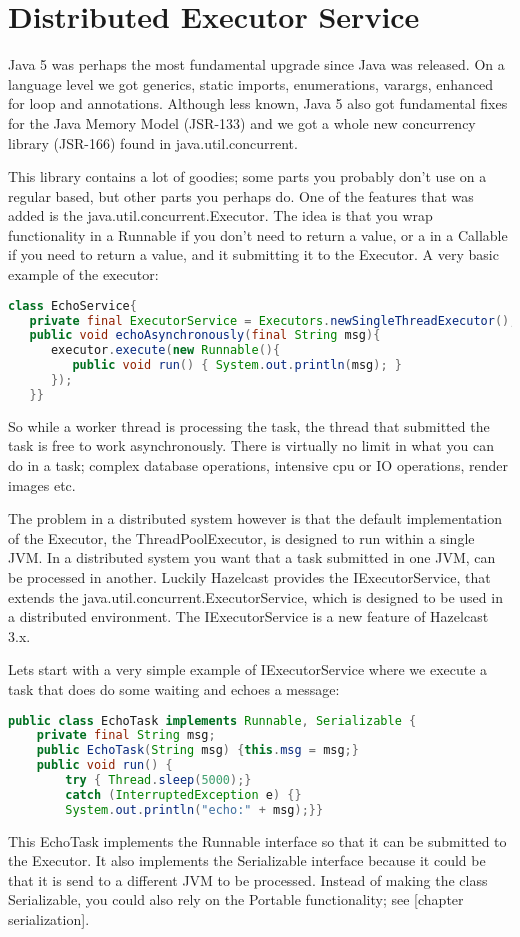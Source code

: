 \chapter{Distributed Executor Service}
Java 5 was perhaps the most fundamental upgrade since Java was released. On a language level we got generics, static imports, enumerations, varargs, enhanced for loop and annotations. Although less known, Java 5 also got fundamental fixes for the Java Memory Model (JSR-133) and we got a whole new concurrency library (JSR-166) found in java.util.concurrent.

This library contains a lot of goodies; some parts you probably don't use on a regular based, but other parts you perhaps do. One of the features that was added is the java.util.concurrent.Executor. The idea is that you wrap functionality in a Runnable if you don't need to return a value, or a in a Callable if you need to return a value, and it submitting it to the Executor. A very basic example of the executor:
\begin{lstlisting}[language=java]
class EchoService{
   private final ExecutorService = Executors.newSingleThreadExecutor();
   public void echoAsynchronously(final String msg){
      executor.execute(new Runnable(){
         public void run() { System.out.println(msg); }
      });	
   }}
\end{lstlisting}
So while a worker thread is processing the task, the thread that submitted the task is free to work asynchronously. There is virtually no limit in what you can do in a task; complex database operations, intensive cpu or IO operations, render images etc. 

The problem in a distributed system however is that the default implementation of the Executor, the ThreadPoolExecutor, is designed to run within a single JVM. In a distributed system you want that a task submitted in one JVM, can be processed in another. Luckily Hazelcast provides the IExecutorService, that extends the java.util.concurrent.ExecutorService, which is designed to be used in a distributed environment. The IExecutorService is a new feature of Hazelcast 3.x.

Lets start with a very simple example of IExecutorService where we execute a task that does do some waiting and echoes a message:
\begin{lstlisting}[language=java]
public class EchoTask implements Runnable, Serializable {
    private final String msg;
    public EchoTask(String msg) {this.msg = msg;}
    public void run() {
        try { Thread.sleep(5000);} 
        catch (InterruptedException e) {}
        System.out.println("echo:" + msg);}}
\end{lstlisting}
This EchoTask implements the Runnable interface so that it can be submitted to the Executor. It also implements the Serializable interface because it could be that it is send to a different JVM to be processed. Instead of making the class Serializable, you could also rely on the Portable functionality; see [chapter serialization]. 

